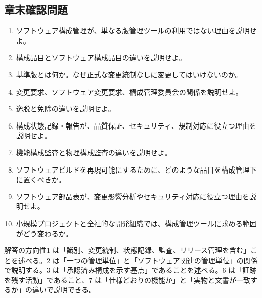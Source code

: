 \subsection*{章末確認問題}
\begin{enumerate}
\item ソフトウェア構成管理が、単なる版管理ツールの利用ではない理由を説明せよ。
\item 構成品目とソフトウェア構成品目の違いを説明せよ。
\item 基準版とは何か。なぜ正式な変更統制なしに変更してはいけないのか。
\item 変更要求、ソフトウェア変更要求、構成管理委員会の関係を説明せよ。
\item 逸脱と免除の違いを説明せよ。
\item 構成状態記録・報告が、品質保証、セキュリティ、規制対応に役立つ理由を説明せよ。
\item 機能構成監査と物理構成監査の違いを説明せよ。
\item ソフトウェアビルドを再現可能にするために、どのような品目を構成管理下に置くべきか。
\item ソフトウェア部品表が、変更影響分析やセキュリティ対応に役立つ理由を説明せよ。
\item 小規模プロジェクトと全社的な開発組織では、構成管理ツールに求める範囲がどう変わるか。
\end{enumerate}
\begin{notebox}{解答の方向性}1 は「識別、変更統制、状態記録、監査、リリース管理を含む」ことを述べる。2 は「一つの管理単位」と「ソフトウェア関連の管理単位」の関係で説明する。3 は「承認済み構成を示す基点」であることを述べる。6 は「証跡を残す活動」であること、7 は「仕様どおりの機能か」と「実物と文書が一致するか」の違いで説明できる。\end{notebox}
